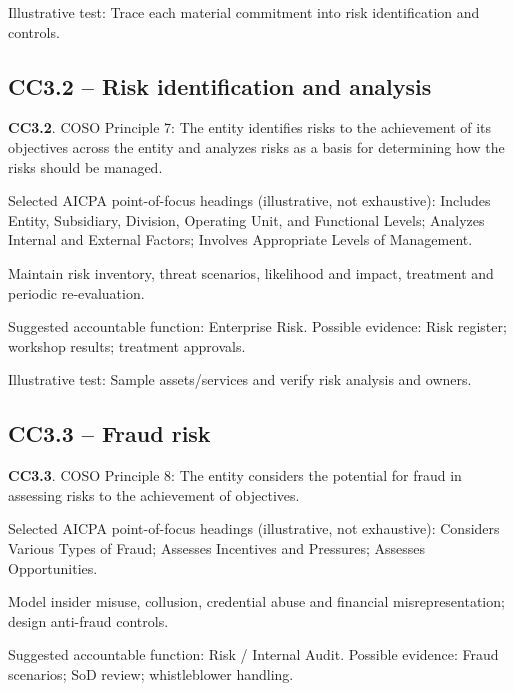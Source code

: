 \documentclass[10pt,oneside]{report}
\begin{document}
Illustrative test: Trace each material commitment into risk identification and controls.

\subsection*{CC3.2 -- Risk identification and analysis}
\begin{aicpabox}
\textbf{CC3.2}. COSO Principle 7: The entity identifies risks to the achievement of its objectives across the entity and analyzes risks as a basis for determining how the risks should be managed.\par{}
\end{aicpabox}
Selected AICPA point-of-focus headings (illustrative, not exhaustive): Includes Entity, Subsidiary, Division, Operating Unit, and Functional Levels; Analyzes Internal and External Factors; Involves Appropriate Levels of Management.

\begin{engineeringbox}
Maintain risk inventory, threat scenarios, likelihood and impact, treatment and periodic re-evaluation.
\end{engineeringbox}
Suggested accountable function: Enterprise Risk. Possible evidence: Risk register; workshop results; treatment approvals.

Illustrative test: Sample assets/services and verify risk analysis and owners.

\subsection*{CC3.3 -- Fraud risk}
\begin{aicpabox}
\textbf{CC3.3}. COSO Principle 8: The entity considers the potential for fraud in assessing risks to the achievement of objectives.\par{}
\end{aicpabox}
Selected AICPA point-of-focus headings (illustrative, not exhaustive): Considers Various Types of Fraud; Assesses Incentives and Pressures; Assesses Opportunities.

\begin{engineeringbox}
Model insider misuse, collusion, credential abuse and financial misrepresentation; design anti-fraud controls.
\end{engineeringbox}
Suggested accountable function: Risk / Internal Audit. Possible evidence: Fraud scenarios; SoD review; whistleblower handling.
\end{document}
